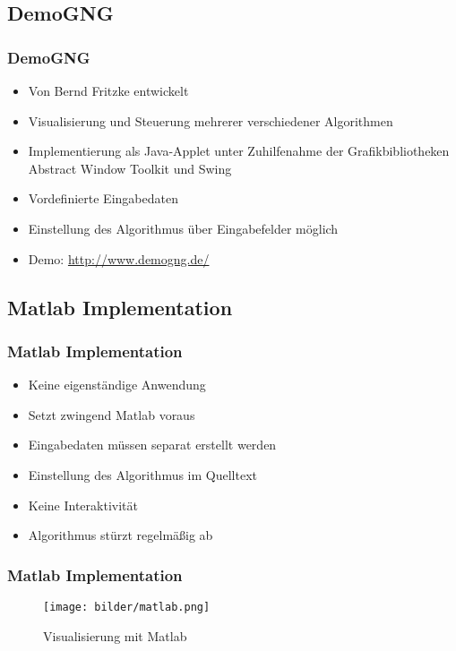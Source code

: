 \subsection{DemoGNG}
\begin{frame}
	\frametitle{DemoGNG}
	\begin{itemize}
		\item Von Bernd Fritzke entwickelt
		\item Visualisierung und Steuerung mehrerer verschiedener Algorithmen
		\item Implementierung als Java-Applet unter Zuhilfenahme der 
		Grafikbibliotheken Abstract Window Toolkit und Swing
		\item Vordefinierte Eingabedaten
		\item Einstellung des Algorithmus über Eingabefelder möglich
		\item Demo: \url{http://www.demogng.de/}
	\end{itemize}
	
\end{frame}

\subsection{Matlab Implementation}
\begin{frame}
	\frametitle{Matlab Implementation}
	\begin{itemize}
		\item Keine eigenständige Anwendung
		\item Setzt zwingend Matlab voraus
		\item Eingabedaten müssen separat erstellt werden
		\item Einstellung des Algorithmus im Quelltext
		\item Keine Interaktivität
		\item Algorithmus stürzt regelmäßig ab
	\end{itemize}
\end{frame}
\begin{frame}
	\frametitle{Matlab Implementation}
	\begin{figure}[h!]
		\centering
		\texttt{[image: bilder/matlab.png]}
		\caption{Visualisierung mit Matlab}
		\label{fig:matlab}
	\end{figure}
\end{frame}

